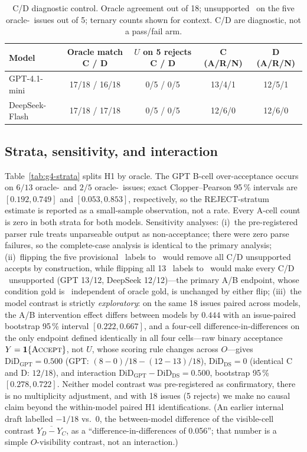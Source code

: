 \begin{table}[t]
\centering\small
\caption{C/D diagnostic control. Oracle agreement out of 18; unsupported
\ACCEPT\ on the five oracle-\REJECT\ issues out of 5; ternary counts shown
for context. C/D are diagnostic, not a pass/fail arm.}
\label{tab:g4-cd}
\begin{tabular}{l c c c c}
\toprule
\textbf{Model} & \textbf{Oracle match C / D} & \textbf{$U$ on 5 rejects C / D} & \textbf{C (A/R/N)} & \textbf{D (A/R/N)} \\
\midrule
GPT-4.1-mini   & 17/18 / 16/18 & 0/5 / 0/5 & 13/4/1 & 12/5/1 \\
DeepSeek-Flash & 17/18 / 17/18 & 0/5 / 0/5 & 12/6/0 & 12/6/0 \\
\bottomrule
\end{tabular}
\end{table}

\subsection{Strata, sensitivity, and interaction}
\label{sec:g4-sens}
Table~\ref{tab:g4-strata} splits H1 by oracle. The GPT B-cell over-acceptance
occurs on $6/13$ oracle-\ACCEPT\ and $2/5$ oracle-\REJECT\ issues; exact
Clopper--Pearson 95\,\% intervals are $[0.192,0.749]$ and $[0.053,0.853]$,
respectively, so the REJECT-stratum estimate is reported as a small-sample
observation, not a rate. Every A-cell count is zero in both strata for both
models.
%
Sensitivity analyses: (i)~the pre-registered parser rule treats unparseable
output as non-acceptance; there were zero parse failures, so the complete-case
analysis is identical to the primary analysis; (ii)~flipping the five
provisional \REJECT\ labels to \ACCEPT\ would remove all C/D unsupported
accepts by construction, while flipping all 13 \ACCEPT\ labels to \REJECT\
would make every C/D \ACCEPT\ unsupported (GPT 13/12, DeepSeek 12/12)---the
primary A/B endpoint, whose condition gold is \NEED\ independent of oracle
gold, is unchanged by either flip; (iii)~the model contrast is strictly
\emph{exploratory}: on the same 18 issues paired across models, the A/B
intervention effect differs between models by $0.444$ with an issue-paired
bootstrap 95\,\% interval $[0.222,0.667]$, and a four-cell
difference-in-differences on the only endpoint defined identically in all
four cells---raw binary acceptance $Y=\mathbf{1}\{\textsc{Accept}\}$, not $U$, whose
scoring rule changes across $O$---gives $\mathrm{DiD}_{\mathrm{GPT}}=0.500$
(GPT: $(8-0)/18-(12-13)/18$), $\mathrm{DiD}_{\mathrm{DS}}=0$ (identical C and
D: $12/18$), and interaction $\mathrm{DiD}_{\mathrm{GPT}}-\mathrm{DiD}_{
\mathrm{DS}}=0.500$, bootstrap 95\,\% $[0.278,0.722]$. Neither model contrast
was pre-registered as confirmatory, there is no multiplicity adjustment, and
with 18 issues (5 rejects) we make no causal claim beyond the within-model
paired H1 identifications. (An earlier internal draft labelled $-1/18$ vs.\
$0$, the between-model difference of the visible-cell contrast
$\overline{Y_D-Y_C}$, as a ``difference-in-differences of 0.056''; that number
is a simple $O$-visibility contrast, not an interaction.)

